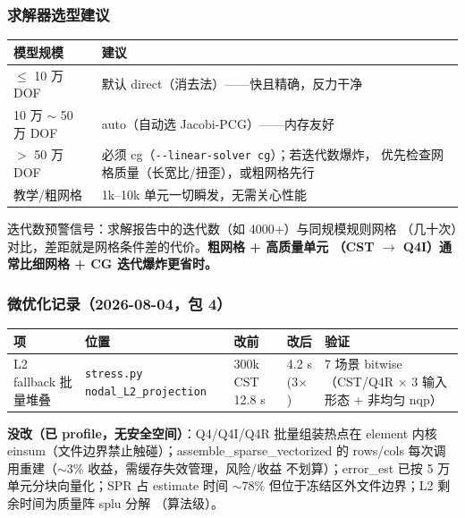 \documentclass[12pt,a4paper]{ctexart}
\newcommand{\fem}{\Verb}
\begin{document}
\subsubsection{求解器选型建议}

\begin{table}[h]
\centering
\small
\begin{tabular}{p{4cm}p{11cm}}
\toprule
\textbf{模型规模} & \textbf{建议} \\
\midrule
$\le$ 10 万 DOF & 默认 direct（消去法）——快且精确，反力干净 \\
10 万 $\sim$ 50 万 DOF & auto（自动选 Jacobi-PCG）——内存友好 \\
$>$ 50 万 DOF & 必须 cg（\fem|--linear-solver cg|）；若迭代数爆炸，
优先检查网格质量（长宽比/扭歪），或粗网格先行 \\
教学/粗网格 & 1k--10k 单元一切瞬发，无需关心性能 \\
\bottomrule
\end{tabular}
\end{table}

迭代数预警信号：求解报告中的迭代数（如 4000+）与同规模规则网格
（几十次）对比，差距就是网格条件差的代价。\textbf{粗网格 + 高质量单元
（CST $\to$ Q4I）通常比细网格 + CG 迭代爆炸更省时。}

\subsubsection{微优化记录（2026-08-04，包 4）}

\begin{table}[h]
\centering
\small
\begin{tabular}{p{2.9cm}p{3.3cm}p{2.2cm}p{2.0cm}p{3.2cm}}
\toprule
\textbf{项} & \textbf{位置} & \textbf{改前} & \textbf{改后} & \textbf{验证} \\
\midrule
L2 fallback 批量堆叠 & \texttt{stress.py \newline nodal\_L2\_\newline projection} & 300k CST 12.8 s & 4.2 s (3$\times$) & 7 场景 bitwise（CST/Q4R $\times$ 3 输入形态 + 非均匀 nqp） \\
\bottomrule
\end{tabular}
\end{table}

\textbf{没改（已 profile，无安全空间）}：Q4/Q4I/Q4R 批量组装热点在
element 内核 einsum（文件边界禁止触碰）；assemble\_sparse\_vectorized
的 rows/cols 每次调用重建（$\sim$3\% 收益，需缓存失效管理，风险/收益
不划算）；error\_est 已按 5 万单元分块向量化；SPR 占 estimate 时间
$\sim$78\% 但位于冻结区外文件边界；L2 剩余时间为质量阵 splu 分解
（算法级）。
\end{document}
